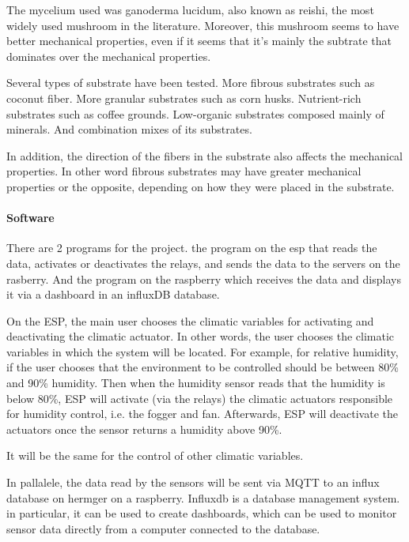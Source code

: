 The mycelium used was ganoderma lucidum, also known as reishi, the most widely used mushroom in the literature.\cite{yang2021material}
Moreover, this mushroom seems to have better mechanical properties, even if it seems that it's mainly the subtrate that dominates over the mechanical properties. 

Several types of substrate have been tested. More fibrous substrates such as coconut fiber. More granular substrates such as corn husks. Nutrient-rich substrates such as coffee grounds. Low-organic substrates composed mainly of minerals. 
And combination mixes of its substrates.

In addition, the direction of the fibers in the substrate also affects the mechanical properties. In other word fibrous substrates may have greater mechanical properties or the opposite, depending on how they were placed in the substrate.

\paragraph{Software}

There are 2 programs for the project. the program on the esp that reads the data, activates or deactivates the relays, and sends the data to the servers on the rasberry. 
And the program on the raspberry which receives the data and displays it via a dashboard in an influxDB database. 

On the ESP, the main user chooses the climatic variables for activating and deactivating the climatic actuator. In other words, the user chooses the climatic variables in which the system will be located. For example, for relative humidity, if the user chooses that the environment to be controlled should be between 80\% and 90\% humidity. Then when the humidity sensor reads that the humidity is below 80\%, ESP will activate (via the relays) the climatic actuators responsible for humidity control, i.e. the fogger and fan. Afterwards, ESP will deactivate the actuators once the sensor returns a humidity above 90\%.

It will be the same for the control of other climatic variables. 

In pallalele, the data read by the sensors will be sent via MQTT to an influx database on hermger on a raspberry. 
Influxdb is a database management system. in particular, it can be used to create dashboards, which can be used to monitor sensor data directly from a computer connected to the database. 

